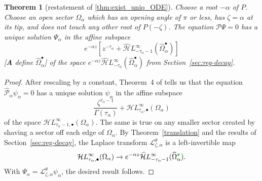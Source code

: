 \documentclass{article}
\newcommand{\singexp}[2]{\mathcal{H}L^\infty_{#1, #2}}
\newcommand{\singexpalg}[1]{\singexp{#1}{\bullet}}
\newcommand{\dualsingexp}[1]{\widehat{\mathcal{H}}L^\infty_{#1}}
\newcommand{\laplace}{\mathcal{L}}
\theoremstyle{definition}
\theoremstyle{plain}
\newtheorem{theorem}{Theorem}[section]
\newenvironment{todo}{\color{Coral}}{\color{black}}
\begin{document}
\begin{theorem}[restatement of \ref{thm:exist_uniq_ODE}]\label{re:thm:exist_uniq_ODE}
Choose a root $-\alpha$ of $P$. Choose an open sector $\Omega_\alpha$ which has an opening angle of $\pi$ or less, has $\zeta = \alpha$ at its tip, and does not touch any other root of $P(-\zeta)$. The equation $\mathcal{P}\Psi = 0$ has a unique solution $\Psi_\alpha$ in the affine subspace
\[ e^{-\alpha z} \left[ z^{-\tau_\alpha} + \dualsingexp{-\tau_\alpha-1}(\widehat{\Omega}_\alpha^\bullet) \right] \]
\begin{todo}[\textbf{A} define $\widehat{\Omega}_\alpha^\bullet$]\end{todo} of the space $e^{-\alpha z} \dualsingexp{-\tau_\alpha}(\widehat{\Omega}_\alpha^\bullet)$ from Section~\ref{sec:reg-decay}.
\end{theorem}
\begin{center}
\label{fig:sectorial_domain--with roots P}
\end{center}
\begin{proof}
After rescaling by a constant, Theorem~4 of \cite{reg-sing-volterra} tells us that the equation $\hat{\mathcal{P}}_\alpha \psi_\alpha = 0$ has a unique solution $\psi_\alpha$ in the affine subspace
\[ \frac{\zeta^{\tau_\alpha-1}}{\Gamma(\tau_\alpha)} + \singexpalg{\tau_\alpha}(\Omega_\alpha) \]
of the space $\singexpalg{\tau_\alpha-1}(\Omega_\alpha)$. The same is true on any smaller sector created by shaving a sector off each edge of $\Omega_\alpha$. By Theorem~\ref{translation} and the results of Section~\ref{sec:reg-decay}, the Laplace transform $\laplace^\theta_{\zeta, \alpha}$ is a left-invertible map
\[ \singexpalg{\tau_\alpha}(\Omega_\alpha) \to e^{-\alpha z} \dualsingexp{-\tau_\alpha-1}(\widehat{\Omega}_\alpha^{\textcolor{LimeGreen}{\bullet}}). \]
With $\Psi_\alpha = \laplace^\theta_{\zeta, \alpha} \psi_\alpha$, the desired result follows.
\end{proof}
\end{document}
